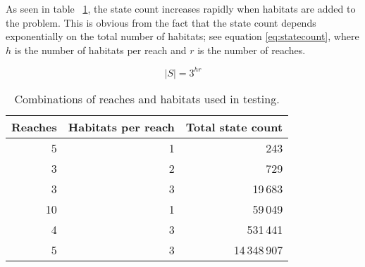 As seen in table ~\ref{tab:reaches_habitats}, the state count increases rapidly
when habitats are added to the problem. This is obvious from the fact that the state count
depends exponentially on the total number of habitats; see equation \eqref{eq:statecount}, where $h$ is the number of habitats per reach and $r$ is the number of reaches.

\begin{equation}
\label{eq:statecount}
 |S| = 3 ^ {hr}
\end{equation}

\begin{table}[H]
\centering
\caption{Combinations of reaches and habitats used in testing.}
\label{tab:reaches_habitats}
\begin{tabular}{rrr}
 \toprule
 Reaches & Habitats per reach & Total state count \\
 \midrule
 5  & 1 &          243 \\
 3  & 2 &          729 \\
 3  & 3 &      19\,683 \\
 10 & 1 &      59\,049 \\
 4  & 3 &     531\,441 \\
 5  & 3 & 14\,348\,907 \\
 \bottomrule
\end{tabular}
\end{table}
